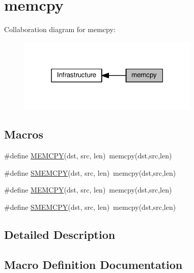 \hypertarget{group__lwip__opts__memcpy}{}\section{memcpy}
\label{group__lwip__opts__memcpy}
Collaboration diagram for memcpy\+:
\nopagebreak
\begin{figure}[H]
\begin{center}
\leavevmode
\includegraphics[width=244pt]{group__lwip__opts__memcpy}
\end{center}
\end{figure}
\subsection*{Macros}
\begin{DoxyCompactItemize}
\item 
\#define \hyperlink{group__lwip__opts__memcpy_gaa1dd57a66b6de8c0593e9e3e8d1411f6}{M\+E\+M\+C\+PY}(dst,  src,  len)~memcpy(dst,src,len)
\item 
\#define \hyperlink{group__lwip__opts__memcpy_ga8c6e3c1e4f74acb16376188dbf8909ec}{S\+M\+E\+M\+C\+PY}(dst,  src,  len)~memcpy(dst,src,len)
\item 
\#define \hyperlink{group__lwip__opts__memcpy_gaa1dd57a66b6de8c0593e9e3e8d1411f6}{M\+E\+M\+C\+PY}(dst,  src,  len)~memcpy(dst,src,len)
\item 
\#define \hyperlink{group__lwip__opts__memcpy_ga8c6e3c1e4f74acb16376188dbf8909ec}{S\+M\+E\+M\+C\+PY}(dst,  src,  len)~memcpy(dst,src,len)
\end{DoxyCompactItemize}


\subsection{Detailed Description}


\subsection{Macro Definition Documentation}
\mbox{\label{group__lwip__opts__memcpy_gaa1dd57a66b6de8c0593e9e3e8d1411f6}} 
